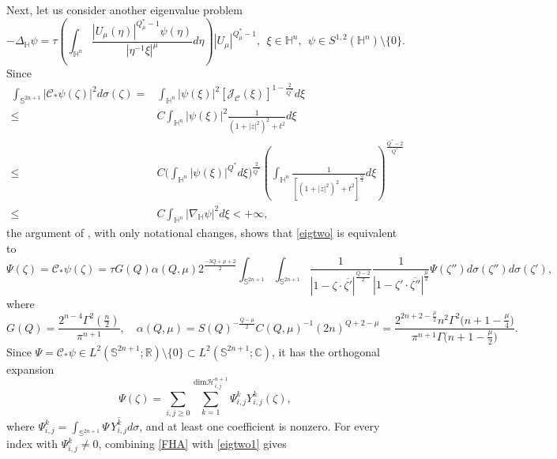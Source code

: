 \documentclass[11pt]{article}
\begin{document}
Next, let us consider another eigenvalue problem
\begin{equation}\label{eigtwo}
 -\Delta_{\mathbb{H}} \psi=\tau\left(\int_{\mathbb{H}^{n}}\frac{|U_\mu(\eta)|
^{Q^{\ast}_{\mu}-1}\psi(\eta)}{|\eta^{-1}\xi|^{\mu}}{d}\eta\right)|U_\mu|^{Q^{\ast}_{\mu}-1},~~\xi\in\mathbb{H}^{n},~~ \psi\in S^{1,2}(\mathbb{H}^{n})\setminus \{0\}.
\end{equation}
Since
\begin{align*}
 \int_{\mathbb{S}^{2n+1}}|\mathcal{C}_*\psi(\zeta)|^2 d \sigma(\zeta)=&\int_{\mathbb{H}^n}|\psi(\xi)|^2
 [\mathcal{J}_\mathcal{C}(\xi)]^{1-\frac{2}{Q^{\ast}}}d \xi\\ \leq & C \int_{\mathbb{H}^n}|\psi(\xi)|^2
 \frac{1}{(1+|z|^2)^2+t^2}d \xi\\
 \leq & C \bigg(\int_{\mathbb{H}^n}|\psi(\xi)|^{Q^{\ast}}d \xi\bigg)^{\frac{2}{Q^{\ast}}}
 \left(\int_{\mathbb{H}^n}\frac{1}{[(1+|z|^2)^2+t^2]^{\frac{Q}{2}}}d \xi\right)^{\frac{Q^{\ast}-2}{Q^{\ast}}}\\
 \leq & C \int_{\mathbb{H}^{n}}|\nabla_{\mathbb{H}}\psi|^{2}{d}\xi<+\infty,
\end{align*}
{the argument of \cite[Lemma 4.5]{YZ251}, with only notational changes, shows that \eqref{eigtwo} is equivalent to}
\begin{equation}\label{eigtwo1}
 \Psi(\zeta)= \mathcal{C}_*\psi(\zeta)=\tau G(Q)\alpha(Q,\mu)2^{\frac{-3Q+\mu+2}{2}}\int_{\mathbb{S}^{2n+1}}\int_{\mathbb{S}^{2n+1}}
 \frac{1}{|1-\zeta\cdot \overline{\zeta'}|^{\frac{Q-2}{2}}}\frac{1}{|1-\zeta'\cdot \overline{\zeta''}|^{\frac{\mu}{2}}}\Psi(\zeta'')d \sigma(\zeta'')d \sigma(\zeta'),
\end{equation}
where
\begin{equation*}
 G(Q)=\frac{2^{n-4}\Gamma^2(\frac{n}{2})}{\pi^{n+1}},\quad \alpha(Q,\mu)=S(Q)^{-\frac{Q-\mu}{2}}C(Q,\mu)^{-1}(2n)^{Q+2-\mu}
 =\frac{2^{2n+2-\frac{\mu}{2}}n^2\Gamma^2\big(n+1-\frac{\mu}{4}\big)}{\pi^{n+1}\Gamma\big(n+1-\frac{\mu}{2}\big)
 }.
\end{equation*}
{Since $\Psi=\mathcal{C}_*\psi\in L^2(\mathbb{S}^{2n+1};\mathbb R)\setminus\{0\}\subset L^2(\mathbb{S}^{2n+1};\mathbb C)$, it has the orthogonal expansion}
\begin{equation*}
 \Psi(\zeta)=\sum\limits_{i,j\geq0}\sum\limits_{k=1}^{\mathrm{dim} \mathcal{H}_{i,j}^{n+1}}\Psi_{i,j}^k Y_{i,j}^k(\zeta),
\end{equation*}
{where $\Psi_{i,j}^k=\int_{\mathbb{S}^{2n+1}}\Psi\,\overline{Y_{i,j}^k}d\sigma$, and at least one coefficient is nonzero. For every index with $\Psi_{i,j}^k\neq0$, combining \eqref{FHA} with \eqref{eigtwo1} gives}
\end{document}
